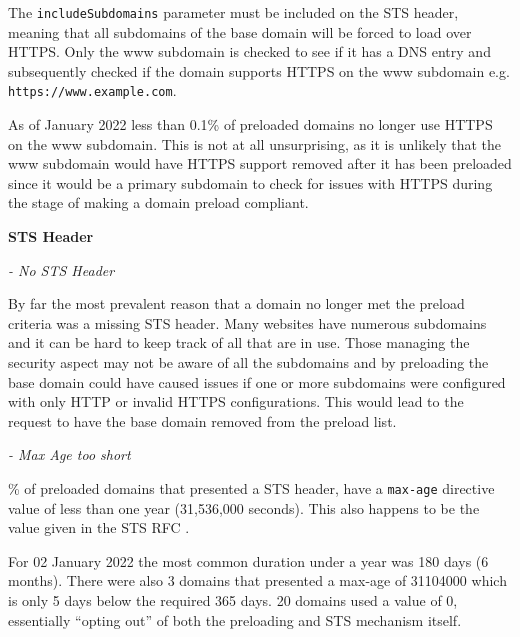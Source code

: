 \documentclass{mscreport}
\begin{document}
\vspace{0.3cm} \noindent
The \texttt{includeSubdomains} parameter must be included on the STS header, meaning that all subdomains of the base domain will be forced to load over HTTPS. Only the www subdomain is checked to see if it has a DNS entry and subsequently checked if the domain supports HTTPS on the www subdomain e.g. \texttt{https://www.example.com}.

\vspace{0.3cm} \noindent
As of January 2022 less than 0.1\% of preloaded domains no longer use HTTPS on the www subdomain. This is not at all unsurprising, as it is unlikely that the www subdomain would have HTTPS support removed after it has been preloaded since it would be a primary subdomain to check for issues with HTTPS during the stage of making a domain preload compliant.

\vspace{0.5cm} \noindent
\textbf{STS Header}

\vspace{0.3cm} \noindent
\textit{- No STS Header}

\vspace{0.3cm} \noindent
By far the most prevalent reason that a domain no longer met the preload criteria was a missing STS header. Many websites have numerous subdomains and it can be hard to keep track of all that are in use. Those managing the security aspect may not be aware of all the subdomains and by preloading the base domain could have caused issues if one or more subdomains were configured with only HTTP or invalid HTTPS configurations. This would lead to the request to have the base domain removed from the preload list.

\vspace{0.3cm} \noindent
\textit{- Max Age too short}

\vspace{0.3cm} \% of preloaded domains that presented a STS header, have a \texttt{max-age} directive value of less than one year (31,536,000 seconds). This also happens to be the value given in the STS RFC \cite{Hodges2012-pe}.

\vspace{0.3cm} \noindent
For 02 January 2022 the most common duration under a year was 180 days (6 months). There were also 3 domains that presented a max-age of 31104000 which is only 5 days below the required 365 days. 20 domains used a value of 0, essentially ``opting out'' of both the preloading and STS mechanism itself.
\end{document}
